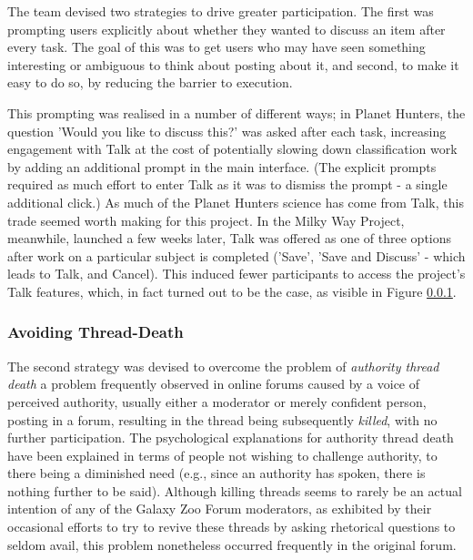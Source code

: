 \documentclass{sigchi}
\begin{document}
The team devised two strategies to drive greater participation. The first was prompting users explicitly about whether they wanted to discuss an item after every task.  The goal of this was to get users who may have seen something interesting or ambiguous to think about posting about it, and second, to make it easy to do so, by reducing the barrier to execution.  

This prompting was realised in a number of different ways; in Planet Hunters, the question 'Would you like to discuss this?' was asked after each task, increasing 
engagement with Talk at the cost of potentially slowing down classification work by adding an additional prompt in the main interface.  (The explicit prompts required as much effort to enter Talk as it was to dismiss the prompt - a single additional click.) As much of the Planet Hunters science has come from Talk, this trade seemed worth making for this project.  In the Milky Way Project,  meanwhile, launched a few weeks later, Talk was offered as one of three options after work on a particular subject is completed ('Save', 'Save and Discuss' - which leads to Talk, and Cancel).  This induced fewer participants to access the project's Talk features, which, in fact turned out to be the case, as visible in Figure \ref{}.  %



\subsubsection{Avoiding Thread-Death}

The second strategy was devised to overcome the problem of \emph{authority thread death} \cite{} a problem frequently observed in online forums caused by a voice of perceived authority, usually either a moderator or merely confident person, posting in a forum, resulting in the thread being subsequently \emph{killed}, with no further participation.  The psychological explanations for authority thread death have been explained in terms of people not wishing to challenge authority, to there being a diminished need (e.g., since an authority has spoken, there is nothing further to be said).  Although killing threads seems to rarely be an actual intention of any of the Galaxy Zoo Forum moderators, as exhibited by their occasional efforts to try to revive these threads by asking rhetorical questions to seldom avail, this problem nonetheless occurred frequently in the original forum.
\end{document}
